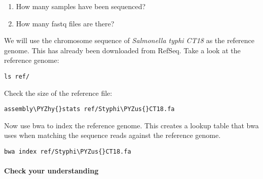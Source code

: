 \documentclass[11pt]{article}
\makeatletter
\providecommand{\tightlist}{%
      \setlength{\itemsep}{0pt}\setlength{\parskip}{0pt}}
\def\PYZus{\char`\_}
\def\PYZhy{\char`\-}
\newcommand{\boxspacing}{\kern\kvtcb@left@rule\kern\kvtcb@boxsep}
\newcommand{\prompt}[4]{
        {
        \ttfamily\llap{{\color{blue}\LARGE\faKeyboardO\hspace{3pt}#4}}\vspace{-\baselineskip}
	}
    }
\makeatother
\begin{document}
\begin{enumerate}
\def\labelenumi{\arabic{enumi}.}
\tightlist
\item
  How many samples have been sequenced?
\item
  How many fastq files are there?
\end{enumerate}

    We will use the chromosome sequence of \textit{Salmonella typhi CT18} as
the reference genome. This has already been downloaded from RefSeq. Take
a look at the reference genome:

    \begin{tcolorbox}[breakable, size=fbox, boxrule=1pt, pad at break*=1mm,colback=cellbackground, colframe=cellborder]
\prompt{In}{incolor}{ }{\boxspacing}
\begin{Verbatim}[commandchars=\\\{\}]
ls ref/
\end{Verbatim}
\end{tcolorbox}

    Check the size of the reference file:

    \begin{tcolorbox}[breakable, size=fbox, boxrule=1pt, pad at break*=1mm,colback=cellbackground, colframe=cellborder]
\prompt{In}{incolor}{ }{\boxspacing}
\begin{Verbatim}[commandchars=\\\{\}]
assembly\PYZhy{}stats ref/Styphi\PYZus{}CT18.fa
\end{Verbatim}
\end{tcolorbox}

    Now use bwa to index the reference genome. This creates a lookup table
that bwa uses when matching the sequence reads against the reference
genome.

    \begin{tcolorbox}[breakable, size=fbox, boxrule=1pt, pad at break*=1mm,colback=cellbackground, colframe=cellborder]
\prompt{In}{incolor}{ }{\boxspacing}
\begin{Verbatim}[commandchars=\\\{\}]
bwa index ref/Styphi\PYZus{}CT18.fa
\end{Verbatim}
\end{tcolorbox}

    \hypertarget{check-your-understanding}{%
\paragraph{Check your understanding}\label{check-your-understanding}}
\end{document}
